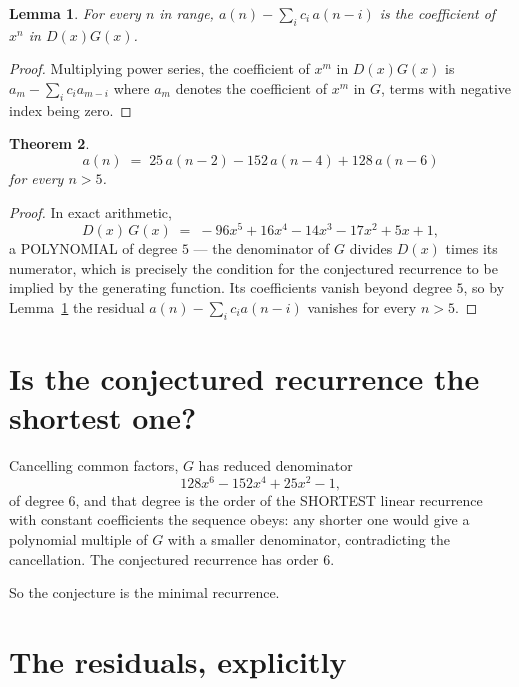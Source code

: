 \documentclass[11pt,a4paper]{article}
\theoremstyle{plain}
\newtheorem{theorem}{Theorem}
\newtheorem{lemma}[theorem]{Lemma}
\theoremstyle{definition}
\begin{document}
\begin{lemma}\label{lem:key}
For every $n$ in range, $a(n)-\sum_i c_i\,a(n-i)$ is the coefficient of $x^{n}$ in
$D(x)G(x)$.
\end{lemma}

\begin{proof}
Multiplying power series, the coefficient of $x^{m}$ in $D(x)G(x)$ is
$a_m-\sum_i c_i a_{m-i}$ where $a_m$ denotes the coefficient of $x^{m}$ in $G$, terms with
negative index being zero.
\end{proof}

\begin{theorem}
\[
a(n)\;=\;25\,a(n-2) - 152\,a(n-4) + 128\,a(n-6)
\]
for every $n>5$.
\end{theorem}

\begin{proof}
In exact arithmetic,
\[
D(x)\,G(x)\;=\;- 96 x^{5} + 16 x^{4} - 14 x^{3} - 17 x^{2} + 5 x + 1,
\]
a POLYNOMIAL of degree $5$ --- the denominator of $G$ divides $D(x)$ times its numerator,
which is precisely the condition for the conjectured recurrence to be implied by the
generating function. Its coefficients vanish beyond degree $5$, so by
Lemma~\ref{lem:key} the residual $a(n)-\sum_ic_ia(n-i)$ vanishes for every
$n>5$.
\end{proof}

\section{Is the conjectured recurrence the shortest one?}

Cancelling common factors, $G$ has reduced denominator
\[
128 x^{6} - 152 x^{4} + 25 x^{2} - 1,
\]
of degree $6$, and that degree is the order of the SHORTEST linear recurrence with
constant coefficients the sequence obeys: any shorter one would give a polynomial multiple of
$G$ with a smaller denominator, contradicting the cancellation. The conjectured recurrence has
order $6$.

So the conjecture is the minimal recurrence.

\section{The residuals, explicitly}
\end{document}
